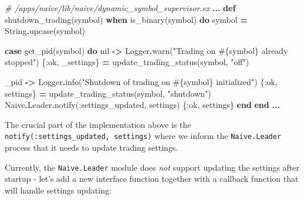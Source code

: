 \documentclass[
  oneside]{book}
\newenvironment{Shaded}{\begin{snugshade}}{\end{snugshade}}
\newcommand{\CommentTok}[1]{\textcolor[rgb]{0.56,0.35,0.01}{\textit{#1}}}
\newcommand{\ConstantTok}[1]{\textcolor[rgb]{0.00,0.00,0.00}{#1}}
\newcommand{\KeywordTok}[1]{\textcolor[rgb]{0.13,0.29,0.53}{\textbf{#1}}}
\newcommand{\NormalTok}[1]{#1}
\newcommand{\OperatorTok}[1]{\textcolor[rgb]{0.81,0.36,0.00}{\textbf{#1}}}
\newcommand{\OtherTok}[1]{\textcolor[rgb]{0.56,0.35,0.01}{#1}}
\newcommand{\StringTok}[1]{\textcolor[rgb]{0.31,0.60,0.02}{#1}}
\newcommand{\VariableTok}[1]{\textcolor[rgb]{0.00,0.00,0.00}{#1}}
\begin{document}
\begin{Shaded}
\begin{Highlighting}[]
\CommentTok{\# /apps/naive/lib/naive/dynamic\_symbol\_supervisor.ex}
  \OperatorTok{...}
  \KeywordTok{def}\NormalTok{ shutdown\_trading(symbol) }\KeywordTok{when}\NormalTok{ is\_binary(symbol) }\KeywordTok{do}
\NormalTok{    symbol }\OperatorTok{=} \ConstantTok{String}\OperatorTok{.}\NormalTok{upcase(symbol)}

    \KeywordTok{case}\NormalTok{ get\_pid(symbol) }\KeywordTok{do}
      \ConstantTok{nil} \OperatorTok{{-}\textgreater{}}
        \ConstantTok{Logger}\OperatorTok{.}\NormalTok{warn(}\StringTok{"Trading on }\OtherTok{\#\{}\NormalTok{symbol}\OtherTok{\}}\StringTok{ already stopped"}\NormalTok{)}
\NormalTok{        \{}\VariableTok{:ok}\NormalTok{, \_settings\} }\OperatorTok{=}\NormalTok{ update\_trading\_status(symbol, }\StringTok{"off"}\NormalTok{)}

\NormalTok{      \_pid }\OperatorTok{{-}\textgreater{}}
        \ConstantTok{Logger}\OperatorTok{.}\NormalTok{info(}\StringTok{"Shutdown of trading on }\OtherTok{\#\{}\NormalTok{symbol}\OtherTok{\}}\StringTok{ initialized"}\NormalTok{)}
\NormalTok{        \{}\VariableTok{:ok}\NormalTok{, settings\} }\OperatorTok{=}\NormalTok{ update\_trading\_status(symbol, }\StringTok{"shutdown"}\NormalTok{)}
        \ConstantTok{Naive}\OperatorTok{.}\ConstantTok{Leader}\OperatorTok{.}\NormalTok{notify(}\VariableTok{:settings\_updated}\NormalTok{, settings)}
\NormalTok{        \{}\VariableTok{:ok}\NormalTok{, settings\}}
    \KeywordTok{end}
  \KeywordTok{end}
  \OperatorTok{...}
\end{Highlighting}
\end{Shaded}

The crucial part of the implementation above is the \texttt{notify(:settings\_updated,\ settings)} where we inform the \texttt{Naive.Leader} process that it needs to update trading settings.

Currently, the \texttt{Naive.Leader} module does \emph{not} support updating the settings after startup - let's add a new interface function together with a callback function that will handle settings updating:
\end{document}
